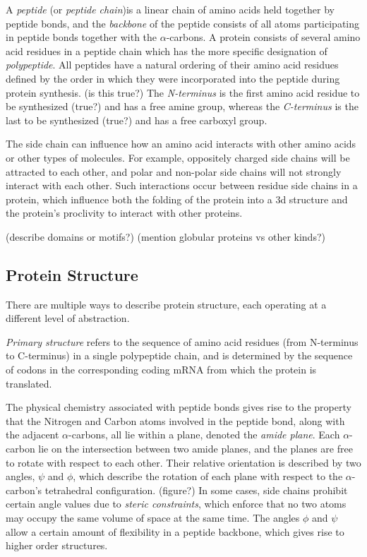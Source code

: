 A \textit{peptide} (or \textit{peptide chain})is a linear chain of amino acids held together by peptide bonds, and the \textit{backbone} of the peptide consists of all atoms participating in peptide bonds together with the $\alpha$-carbons.
A protein consists of several amino acid residues in a peptide chain which has the more specific designation of \textit{polypeptide}.
All peptides have a natural ordering of their amino acid residues defined by the order in which they were incorporated into the peptide during protein synthesis. (is this true?)
The \textit{N-terminus} is the first amino acid residue to be synthesized (true?) and has a free amine group, whereas the \textit{C-terminus} is the last to be synthesized (true?) and has a free carboxyl group. 


The side chain can influence how an amino acid interacts with other amino acids or other types of molecules. For example, oppositely charged side chains will be attracted to each other, and polar and non-polar side chains will not strongly interact with each other. 
Such interactions occur between residue side chains in a protein, which influence both the folding of the protein into a 3d structure and the protein’s proclivity to interact with other proteins.

(describe domains or motifs?)
(mention globular proteins vs other kinds?)


\subsection{Protein Structure}

There are multiple ways to describe protein structure, each operating at a different level of abstraction. 

\textit{Primary structure} refers to the sequence of amino acid residues (from N-terminus to C-terminus) in a single polypeptide chain, and is determined by the sequence of codons in the corresponding coding mRNA from which the protein is translated. 

The physical chemistry associated with peptide bonds gives rise to the property that the Nitrogen and Carbon atoms involved in the peptide bond, along with the adjacent $\alpha$-carbons, all lie within a plane, denoted the \textit{amide plane}.
Each $\alpha$-carbon lie on the intersection between two amide planes, and the planes are free to rotate with respect to each other. 
Their relative orientation is described by two angles, $\psi$ and $\phi$, which describe the rotation of each plane with respect to the $\alpha$-carbon's tetrahedral configuration. (figure?)
In some cases, side chains prohibit certain angle values due to \textit{steric constraints}, which enforce that no two atoms may occupy the same volume of space at the same time.
The angles $\phi$ and $\psi$ allow a certain amount of flexibility in a peptide backbone, which gives rise to higher order structures.

